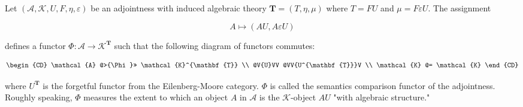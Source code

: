 Let $(\mathcal{A}, \mathcal{K}, U, F, \eta, \varepsilon)$ be an adjointness with induced algebraic theory $\mathbf{T} = (T, \eta, \mu)$ where $T = FU$ and $\mu = F\varepsilon U$. The assignment

$$A \longmapsto (AU, A\varepsilon U)$$

defines a functor $\Phi\colon \mathcal{A} \longrightarrow \mathcal{K}^{\mathbf{T}}$ such that the following diagram of functors commutes:

\[
\begin{CD}
\mathcal{A} @>{\Phi}>> \mathcal{K}^{\mathbf{T}} \\
@V{U}VV @VV{U^{\mathbf{T}}}V \\
\mathcal{K} @= \mathcal{K}
\end{CD}
\]

where $U^{\mathbf{T}}$ is the forgetful functor from the Eilenberg-Moore category. $\Phi$ is called the semantics comparison functor of the adjointness. Roughly speaking, $\Phi$ measures the extent to which an object $A$ in $\mathcal{A}$ is the $\mathcal{K}$-object $AU$ "with algebraic structure."
